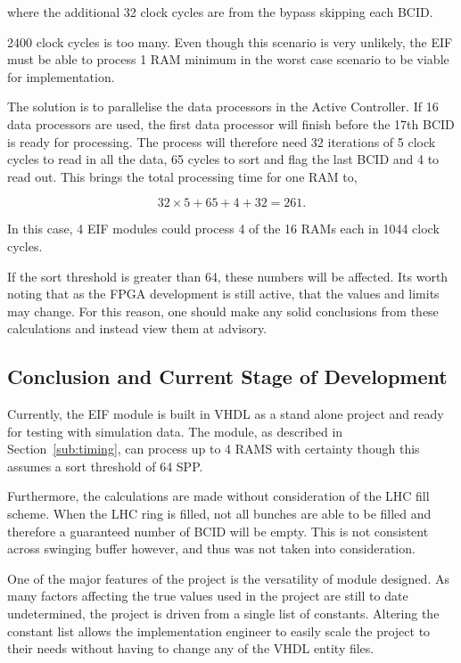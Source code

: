 		where the additional 32 clock cycles are from the bypass skipping each BCID.

		2400 clock cycles is too many. 
		Even though this scenario is very unlikely, the EIF must be able to process 1 RAM minimum in the worst case scenario to be viable for implementation.

		The solution is to parallelise the data processors in the Active Controller.
		If 16 data processors are used, the first data processor will finish before the 17th BCID is ready for processing.
		The process will therefore need 32 iterations of 5 clock cycles to read in all the data, 65 cycles to sort and flag the last BCID and 4 to read out.
		This brings the total processing time for one RAM to,

		\begin{equation}
			32 \times 5 + 65 + 4 + 32 = 261.
		\end{equation}  

		In this case, 4 EIF modules could process 4 of the 16 RAMs each in 1044 clock cycles.

		If the sort threshold is greater than 64, these numbers will be affected.
		Its worth noting that as the FPGA development is still active, that the values and limits may change.
		For this reason, one should make any solid conclusions from these calculations and instead view them at advisory.


	\subsection{Conclusion and Current Stage of Development} %
	\label{sub:conclusion}

	Currently, the EIF module is built in VHDL as a stand alone project and ready for testing with simulation data.
	The module, as described in Section~\ref{sub:timing}, can process up to 4 RAMS with certainty though this assumes a sort threshold of 64 SPP.
	
	Furthermore, the calculations are made without consideration of the LHC fill scheme.
	When the LHC ring is filled, not all bunches are able to be filled and therefore a guaranteed number of BCID will be empty.
	This is not consistent across swinging buffer however, and thus was not taken into consideration.

	One of the major features of the project is the versatility of module designed.
	As many factors affecting the true values used in the project are still to date undetermined, the project is driven from a single list of constants.
	Altering the constant list allows the implementation engineer to easily scale the project to their needs without having to change any of the VHDL entity files.

